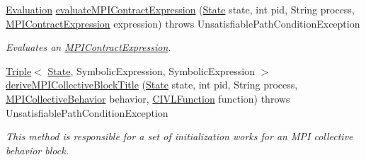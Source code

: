 \begin{DoxyCompactItemize}
\item 
\hyperlink{classedu_1_1udel_1_1cis_1_1vsl_1_1civl_1_1semantics_1_1IF_1_1Evaluation}{Evaluation} \hyperlink{classedu_1_1udel_1_1cis_1_1vsl_1_1civl_1_1library_1_1mpi_1_1LibmpiEvaluator_a10f3fa16ac7757962f7f9d00fc65d6e0}{evaluate\+M\+P\+I\+Contract\+Expression} (\hyperlink{interfaceedu_1_1udel_1_1cis_1_1vsl_1_1civl_1_1state_1_1IF_1_1State}{State} state, int pid, String process, \hyperlink{interfaceedu_1_1udel_1_1cis_1_1vsl_1_1civl_1_1model_1_1IF_1_1expression_1_1MPIContractExpression}{M\+P\+I\+Contract\+Expression} expression)  throws Unsatisfiable\+Path\+Condition\+Exception 
\begin{DoxyCompactList}\small\item\em Evaluates an \hyperlink{}{M\+P\+I\+Contract\+Expression}. \end{DoxyCompactList}\item 
\hyperlink{classedu_1_1udel_1_1cis_1_1vsl_1_1civl_1_1util_1_1IF_1_1Triple}{Triple}$<$ \hyperlink{interfaceedu_1_1udel_1_1cis_1_1vsl_1_1civl_1_1state_1_1IF_1_1State}{State}, Symbolic\+Expression, Symbolic\+Expression $>$ \hyperlink{classedu_1_1udel_1_1cis_1_1vsl_1_1civl_1_1library_1_1mpi_1_1LibmpiEvaluator_ae7cbc930a6c150151bf958cae7e89355}{derive\+M\+P\+I\+Collective\+Block\+Title} (\hyperlink{interfaceedu_1_1udel_1_1cis_1_1vsl_1_1civl_1_1state_1_1IF_1_1State}{State} state, int pid, String process, \hyperlink{interfaceedu_1_1udel_1_1cis_1_1vsl_1_1civl_1_1model_1_1IF_1_1contract_1_1MPICollectiveBehavior}{M\+P\+I\+Collective\+Behavior} behavior, \hyperlink{interfaceedu_1_1udel_1_1cis_1_1vsl_1_1civl_1_1model_1_1IF_1_1CIVLFunction}{C\+I\+V\+L\+Function} function)  throws Unsatisfiable\+Path\+Condition\+Exception 
\begin{DoxyCompactList}\small\item\em This method is responsible for a set of initialization works for an M\+P\+I collective behavior block. \end{DoxyCompactList}\end{DoxyCompactItemize}
